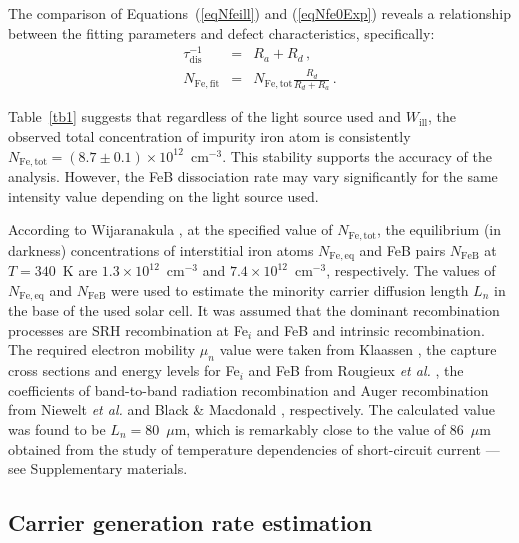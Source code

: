 \documentclass{WileyMSP-template}
\begin{document}
The comparison of Equations~(\ref{eqNfeill}) and (\ref{eqNfe0Exp}) reveals a relationship between
the fitting parameters and defect characteristics, specifically:
\begin{eqnarray}
\label{eqTauRd}
\tau_\mathrm{dis}^{-1}&=&R_a+R_d\,,\\
\label{eqFefit}
N_\mathrm{Fe,fit}&=&N_\mathrm{Fe,tot}\frac{R_d}{R_d+R_a}\,.
\end{eqnarray}

Table~\ref{tb1} suggests that regardless of the light source used and $W_\mathrm{ill}$,
the observed total concentration of impurity iron atom is consistently
$N_\mathrm{Fe,tot}=(8.7\pm0.1)\times10^{12}$~cm$^{-3}$.
This stability supports the accuracy of the analysis.
However, the FeB dissociation rate may vary significantly for the same intensity value depending on the light source used.

According to Wijaranakula \cite{FeB:kinetic}, at the specified value of $N_\mathrm{Fe,tot}$,
the equilibrium (in darkness) concentrations of interstitial iron atoms $N_\mathrm{Fe,eq}$ and FeB pairs
$N_\mathrm{FeB}$ at $T=340$~K are $1.3\times10^{12}$~cm$^{-3}$ and $7.4\times10^{12}$~cm$^{-3}$, respectively.
The values of $N_\mathrm{Fe,eq}$ and $N_\mathrm{FeB}$ were used to estimate the minority carrier diffusion length $L_n$
in the base of the used solar cell.
It was assumed that the dominant recombination processes are SRH recombination at Fe$_i$ and FeB and intrinsic recombination.
The required electron mobility $\mu_n$ value were taken from Klaassen \cite{KLAASSEN953},
the capture cross sections and energy levels for Fe$_i$ and FeB from Rougieux \emph{et al.} \cite{ROUGIEUX2018},
the coefficients of band-to-band radiation recombination and Auger recombination from
Niewelt \emph{et al.} \cite{Brad2022} and Black \& Macdonald \cite{AugerSi2022}, respectively.
The calculated value was found to be $L_n=80$~$\mu$m,
which is remarkably close to the value of 86~$\mu$m  obtained from the study of temperature dependencies of short-circuit current --- see Supplementary materials.


\subsection{Carrier generation rate estimation}\label{SecG}
\end{document}
